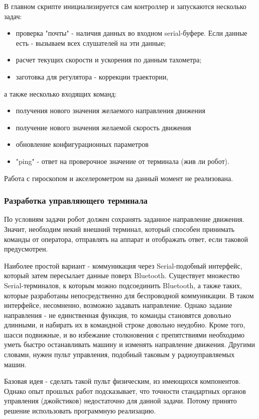 \documentclass[14pt,a4paper,russian]{scrartcl}
\begin{document}
В главном скрипте инициализируется сам контроллер и запускаются несколько задач:
\begin{itemize}
    \item проверка "почты" - наличия данных во входном serial-буфере. Если данные
    есть - вызываем всех слушателей на эти данные;
    \item расчет текущих скорости и ускорения по данным тахометра;
    \item заготовка для регулятора - коррекции траектории,
\end{itemize}
а также несколько входящих команд:
\begin{itemize}
    \item получения нового значения желаемого направления движения
    \item получение нового значения желаемой скорость движения
    \item обновление конфигурационных параметров
    \item "ping" - ответ на проверочное значение от терминала (жив ли робот).
\end{itemize}

Работа с гироскопом и акселерометром на данный момент не реализована.

\subsubsection{Разработка управляющего терминала}
По условиям задачи робот должен сохранять заданное направление движения.
Значит, необходим некий внешний терминал, который способен
принимать команды от оператора, отправлять на аппарат и отображать
ответ, если таковой предусмотрен.

Наиболее простой вариант - коммуникация через Serial-подобный интерфейс,
который затем пересылает данные поверх Bluetooth. Существует множество
Serial-терминалов, к которым можно подсоединить Bluetooth, а также таких,
которые разработаны непосредственно для беспроводной коммуникации.
В таком интерфейсе, несомненно, возможно задавать направление. Однако задание
направления - не единственная функция, то команды становятся довольно длинными,
и набирать их в командной строке довольно неудобно. Кроме того,
шасси подвижные, и во избежание столкновения с препятствиями необходимо уметь
быстро останавливать машину и изменять направление движения. Другими 
словами, нужен пульт управления, подобный таковым у радиоуправляемых машин.

Базовая идея - сделать такой пульт физическим, из имеющихся компонентов.
Однако опыт прошлых работ подсказывает, что точности стандартных
органов управления (джойстиков) недостаточно для данной задачи.
Потому принято решение использовать программную реализацию.
\end{document}
